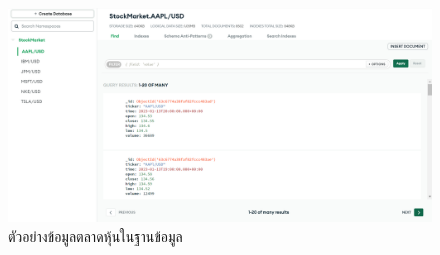 \begin{figure}[ht]
    \centering
    \includegraphics[width=\textwidth]{images/db_example.png}
    \caption{ตัวอย่างข้อมูลตลาดหุ้นในฐานข้อมูล}
\end{figure}

